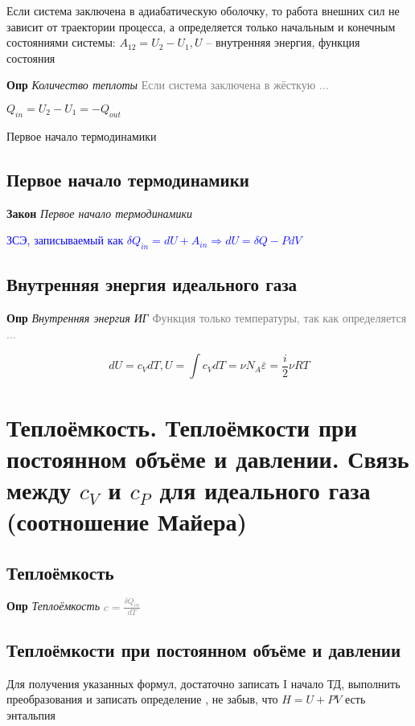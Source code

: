 \documentclass[a4paper, 14pt]{article}
\begin{document}
    Если система заключена в адиабатическую оболочку, то работа внешних сил не зависит от траектории процесса, а
    определяется только начальным и конечным состояниями системы: $A_{12} = U_2 - U_1, U$ -- внутренняя энергия,
    функция состояния

    \textbf{Опр} \textit{Количество теплоты} \textcolor{gray}{Если система заключена в жёсткую ...}

    $Q_{in} = U_2 - U_1 = -Q_{out}$

    Первое начало термодинамики

    \subsection{Первое начало термодинамики}

    \textbf{Закон} \textit{Первое начало термодинамики}

    \textcolor{blue}{ЗСЭ, записываемый как $\delta Q_{in} = dU + A_{in} \Rightarrow dU = \delta Q - PdV$}

    \subsection{Внутренняя энергия идеального газа}

    \textbf{Опр} \textit{Внутренняя энергия ИГ} \textcolor{gray}{Функция только температуры, так как определяется ...}

    \[ dU = c_V dT, U = \int c_V dT = \nu N_A \overline{\varepsilon} = \frac{i}{2} \nu RT \]

    \section{Теплоёмкость.
    Теплоёмкости при постоянном объёме и давлении.
    Связь между $c_V$ и $c_P$ для идеального газа (соотношение Майера)}

    \subsection{Теплоёмкость}

    \textbf{Опр} \textit{Теплоёмкость} \textcolor{gray}{$c = \frac{\delta Q_{in}}{dT}$}

    \subsection{Теплоёмкости при постоянном объёме и давлении}

    Для получения указанных формул, достаточно записать I начало ТД, выполнить преобразования и записать определение
    , не забыв, что $H = U + PV$ есть энтальпия
\end{document}
